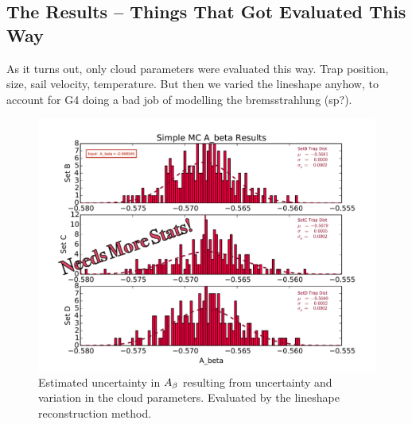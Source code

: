 	\subsection{The Results -- Things That Got Evaluated This Way}
	As it turns out, only cloud parameters were evaluated this way. 
Trap position, size, sail velocity, temperature.  But then we varied the lineshape anyhow, to account for G4 doing a bad job of modelling the bremsstrahlung (sp?).
	
	    \begin{figure}[h!!]
    	\centering
    	\includegraphics[width=.999\linewidth]
    	{Figures/Position_Err_Abeta_prelim.pdf}
    	\caption[$\Abeta$ Position Error]{Estimated uncertainty in $\Abeta$ resulting from uncertainty and variation in the cloud parameters.  Evaluated by the lineshape reconstruction method.   }	
    	\label{fig:Abeta_position_err}
		\end{figure}

